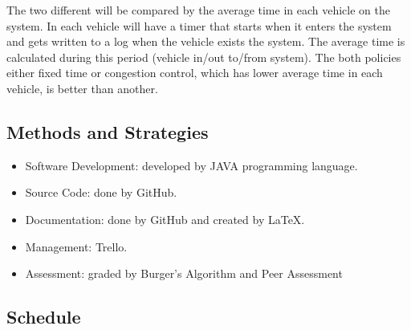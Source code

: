\documentclass[11pt]{article}
\begin{document}
\begin{description}
\begin{itemize}
\begin{itemize}
		The two different will be compared by the average time in each vehicle on the system. In each vehicle will have a timer that starts when it enters the system and gets written to a log when the vehicle exists the system. The average time is calculated during this period (vehicle in/out to/from system). The both policies either fixed time or congestion control, which has lower average time in each vehicle, is better than another. 
		\end{itemize} 		
		
	\end{itemize}
\end{description}

\subsection{Methods and Strategies}
\begin{itemize}
\item Software Development: developed by JAVA programming language.
\item Source Code: done by GitHub.
\item Documentation: done by GitHub and created by LaTeX.
\item Management: Trello.
\item Assessment: graded by Burger’s Algorithm and Peer Assessment
\end{itemize}

\subsection{Schedule}
\end{document}

